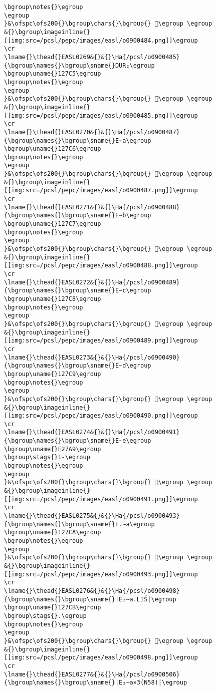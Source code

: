 \begin{verbatim}
\bgroup\notes{}\egroup
\egroup
}&\ofspc\ofs200{}\bgroup\chars{}\bgroup{} 𒟄\egroup \egroup
&{}\bgroup\imageinline{}[[img:src=/pcsl/pepc/images/easl/o0900484.png]]\egroup
\cr
\lname{}\thead{}EASL0269&{}&{}\Ha{/pcsl/o0900485}{\bgroup\names{}\bgroup\sname{}DUR₂\egroup
\bgroup\uname{}127C5\egroup
\bgroup\notes{}\egroup
\egroup
}&\ofspc\ofs200{}\bgroup\chars{}\bgroup{} 𒟅\egroup \egroup
&{}\bgroup\imageinline{}[[img:src=/pcsl/pepc/images/easl/o0900485.png]]\egroup
\cr
\lname{}\thead{}EASL0270&{}&{}\Ha{/pcsl/o0900487}{\bgroup\names{}\bgroup\sname{}E∼a\egroup
\bgroup\uname{}127C6\egroup
\bgroup\notes{}\egroup
\egroup
}&\ofspc\ofs200{}\bgroup\chars{}\bgroup{} 𒟆\egroup \egroup
&{}\bgroup\imageinline{}[[img:src=/pcsl/pepc/images/easl/o0900487.png]]\egroup
\cr
\lname{}\thead{}EASL0271&{}&{}\Ha{/pcsl/o0900488}{\bgroup\names{}\bgroup\sname{}E∼b\egroup
\bgroup\uname{}127C7\egroup
\bgroup\notes{}\egroup
\egroup
}&\ofspc\ofs200{}\bgroup\chars{}\bgroup{} 𒟇\egroup \egroup
&{}\bgroup\imageinline{}[[img:src=/pcsl/pepc/images/easl/o0900488.png]]\egroup
\cr
\lname{}\thead{}EASL0272&{}&{}\Ha{/pcsl/o0900489}{\bgroup\names{}\bgroup\sname{}E∼c\egroup
\bgroup\uname{}127C8\egroup
\bgroup\notes{}\egroup
\egroup
}&\ofspc\ofs200{}\bgroup\chars{}\bgroup{} 𒟈\egroup \egroup
&{}\bgroup\imageinline{}[[img:src=/pcsl/pepc/images/easl/o0900489.png]]\egroup
\cr
\lname{}\thead{}EASL0273&{}&{}\Ha{/pcsl/o0900490}{\bgroup\names{}\bgroup\sname{}E∼d\egroup
\bgroup\uname{}127C9\egroup
\bgroup\notes{}\egroup
\egroup
}&\ofspc\ofs200{}\bgroup\chars{}\bgroup{} 𒟉\egroup \egroup
&{}\bgroup\imageinline{}[[img:src=/pcsl/pepc/images/easl/o0900490.png]]\egroup
\cr
\lname{}\thead{}EASL0274&{}&{}\Ha{/pcsl/o0900491}{\bgroup\names{}\bgroup\sname{}E∼e\egroup
\bgroup\uname{}F27A9\egroup
\bgroup\stags{}1-\egroup
\bgroup\notes{}\egroup
\egroup
}&\ofspc\ofs200{}\bgroup\chars{}\bgroup{} 󲞩\egroup \egroup
&{}\bgroup\imageinline{}[[img:src=/pcsl/pepc/images/easl/o0900491.png]]\egroup
\cr
\lname{}\thead{}EASL0275&{}&{}\Ha{/pcsl/o0900493}{\bgroup\names{}\bgroup\sname{}E₂∼a\egroup
\bgroup\uname{}127CA\egroup
\bgroup\notes{}\egroup
\egroup
}&\ofspc\ofs200{}\bgroup\chars{}\bgroup{} 𒟊\egroup \egroup
&{}\bgroup\imageinline{}[[img:src=/pcsl/pepc/images/easl/o0900493.png]]\egroup
\cr
\lname{}\thead{}EASL0276&{}&{}\Ha{/pcsl/o0900498}{\bgroup\names{}\bgroup\sname{}|E₂∼a.LIŠ|\egroup
\bgroup\uname{}127CB\egroup
\bgroup\stags{}.\egroup
\bgroup\notes{}\egroup
\egroup
}&\ofspc\ofs200{}\bgroup\chars{}\bgroup{} 𒟋\egroup \egroup
&{}\bgroup\imageinline{}[[img:src=/pcsl/pepc/images/easl/o0900498.png]]\egroup
\cr
\lname{}\thead{}EASL0277&{}&{}\Ha{/pcsl/o0900506}{\bgroup\names{}\bgroup\sname{}|E₂∼a×3(N58)|\egroup

\end{verbatim}
